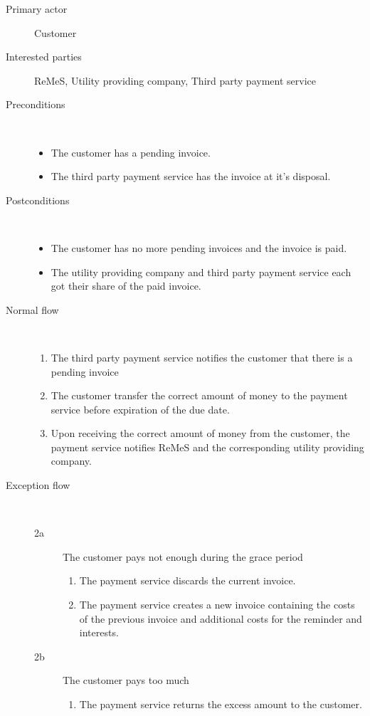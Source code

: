\begin{description}
	\item[Primary actor] Customer
	\item[Interested parties] ReMeS, Utility providing company, Third party payment
	service
	\item[Preconditions] \ 
	\begin{itemize}
		\item The customer has a pending invoice.
		\item The third party payment service has the invoice at it's disposal.
	\end{itemize}
	\item[Postconditions] \ 
	\begin{itemize}
		\item The customer has no more pending invoices and the invoice is paid.
		\item The utility providing company and third party payment service each got
		their share of the paid invoice.
	\end{itemize}
	\item[Normal flow] \ 
	\begin{enumerate}
	  	\item The third party payment service notifies the customer that there is a
	  	pending invoice
	  	\item The customer transfer the correct amount of money to the payment
	  	service before expiration of the due date.
	  	\item Upon receiving the correct amount of money from the customer, the
	  	payment service notifies ReMeS and the corresponding utility providing
	  	company.
	\end{enumerate}
	\item[Exception flow] \ 
	\begin{description}
		\item[2a] The customer pays not enough during the grace period
		\begin{enumerate}
		  \item The payment service discards the current invoice.
		  \item The payment service creates a new invoice containing the costs of the
		  previous invoice and additional costs for the reminder and interests.
		\end{enumerate}
		\item[2b] The customer pays too much
		\begin{enumerate}
		  \item The payment service returns the excess amount to the customer.
		\end{enumerate}
	\end{description}
\end{description}
